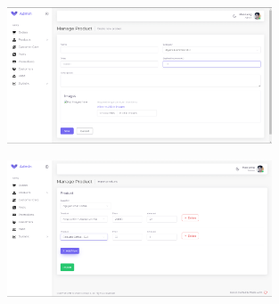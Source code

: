 \begin{figure}[H]
    \centering
    \includegraphics[width=0.7\textwidth]{Demo/Screenshot_12.png}
    \label{fig:supportpage}
\end{figure}
\begin{figure}[H]
    \centering
    \includegraphics[width=0.7\textwidth]{Demo/Screenshot_13.png}
    \label{fig:supportpage}
\end{figure}

